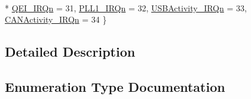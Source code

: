 \begin{DoxyCompactItemize}
\\*
\hyperlink{group__CMSIS__175X__6X__IRQ_ggaaaeafe7bd8401a46d55e8431b6326116a82471ba65527ad3f3da8af38acb953bf}{Q\+E\+I\+\_\+\+I\+R\+Qn} = 31, 
\hyperlink{group__CMSIS__175X__6X__IRQ_ggaaaeafe7bd8401a46d55e8431b6326116a0f0e46a33c20be148ef16fe7ed4dcd4b}{P\+L\+L1\+\_\+\+I\+R\+Qn} = 32, 
\hyperlink{group__CMSIS__175X__6X__IRQ_ggaaaeafe7bd8401a46d55e8431b6326116aa3c495fabd97a50818dc748f738c71e7}{U\+S\+B\+Activity\+\_\+\+I\+R\+Qn} = 33, 
\hyperlink{group__CMSIS__175X__6X__IRQ_ggaaaeafe7bd8401a46d55e8431b6326116a25ef61f3d4a0d5f2bcf0525702b872b7}{C\+A\+N\+Activity\+\_\+\+I\+R\+Qn} = 34
 \}
\end{DoxyCompactItemize}


\subsection{Detailed Description}


\subsection{Enumeration Type Documentation}
